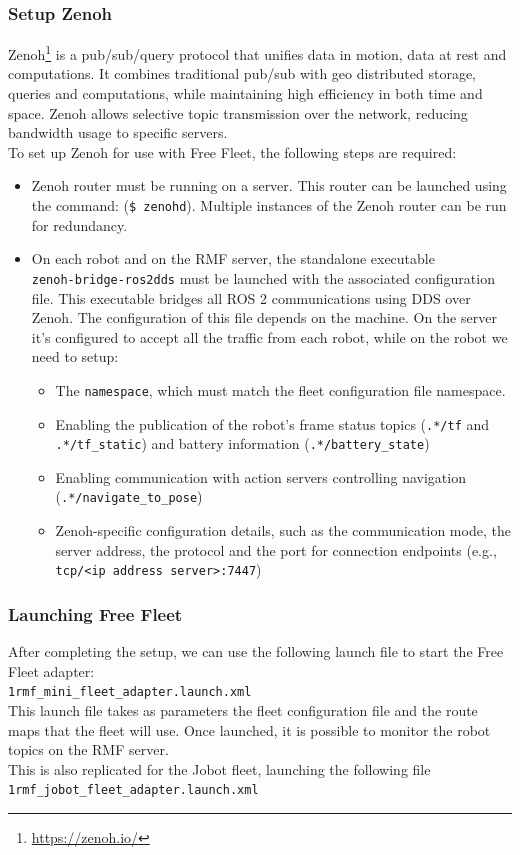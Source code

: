 \subsubsection{Setup Zenoh}
Zenoh\footnote{\href{https://zenoh.io/}{https://zenoh.io/}} is a pub/sub/query protocol that unifies data in motion, data at rest and computations. It combines traditional pub/sub with geo distributed storage, queries and computations, while maintaining high efficiency in both time and space. Zenoh allows selective topic transmission over the network, reducing bandwidth usage to specific servers.\\
To set up Zenoh for use with Free Fleet, the following steps are required:
\begin{itemize}
	\item Zenoh router must be running on a server. This router can be launched using the command: (\texttt{\$ zenohd}). Multiple instances of the Zenoh router can be run for redundancy.
	\item On each robot and on the RMF server, the standalone executable\\ \texttt{zenoh-bridge-ros2dds} must be launched with the associated configuration file. This executable bridges all ROS 2 communications using DDS over Zenoh. The configuration of this file depends on the machine. On the server it's configured to accept all the traffic from each robot, while on the robot we need to setup:
		\begin{itemize}
		 \item The \texttt{namespace}, which must match the fleet configuration file namespace.
		 \item Enabling the publication of the robot’s frame status topics (\texttt{.*/tf} and \texttt{.*/tf\_static}) and battery information (\texttt{.*/battery\_state})
		 \item Enabling communication with action servers controlling navigation\\ (\texttt{.*/navigate\_to\_pose})
		 \item Zenoh-specific configuration details, such as the communication mode, the server address, the protocol and the port for connection endpoints (e.g., \texttt{tcp/<ip address server>:7447})
		\end{itemize}
\end{itemize}
\subsubsection{Launching Free Fleet}
After completing the setup, we can use the following launch file to start the Free Fleet adapter:\\
\texttt{1rmf\_mini\_fleet\_adapter.launch.xml}\\
This launch file takes as parameters the fleet configuration file and the route maps that the fleet will use. Once launched, it is possible to monitor the robot topics on the RMF server.\\
This is also replicated for the Jobot fleet, launching the following file\\
\texttt{1rmf\_jobot\_fleet\_adapter.launch.xml}\\
\newpage
